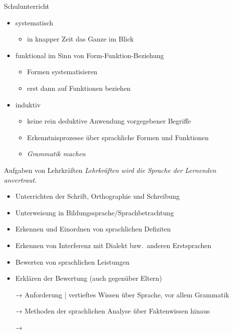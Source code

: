 \begin{frame}
  {Schulunterricht}
  \onslide<+->
  \begin{itemize}[<+->]
    \item \alert{systematisch}
      \begin{itemize}
        \item in knapper Zeit das Ganze im Blick
      \end{itemize}
      \Zeile
    \item funktional im Sinn von \alert{Form-Funktion-Beziehung}
      \begin{itemize}
        \item Formen systematisieren
        \item erst dann auf Funktionen beziehen
      \end{itemize}
      \Zeile
    \item \alert{induktiv}
      \begin{itemize}
        \item keine rein deduktive Anwendung vorgegebener Begriffe
        \item Erkenntnisprozesse über sprachliche Formen und Funktionen
        \item \alert{\textit{Grammatik machen}}\\
      \end{itemize}
  \end{itemize}
\end{frame}

\begin{frame}
  {Aufgaben von Lehrkräften}
  \onslide<+->
  \onslide<+->
  \alert{\textit{Lehrkräften wird die Sprache der Lernenden anvertraut.}} \\
  \Halbzeile
  \begin{itemize}[<+->]
    \item Unterrichten der Schrift, Orthographie und Schreibung
    \item Unterweisung in Bildungssprache\slash Sprachbetrachtung
      \Viertelzeile
    \item Erkennen und \alert{Einordnen} von \alert{sprachlichen Defiziten}
    \item Erkennen von \alert{Interferenz mit Dialekt bzw.\ anderen Erstsprachen}
      \Viertelzeile
    \item \alert{Bewerten} von sprachlichen Leistungen
    \item \alert{Erklären} der Bewertung (auch gegenüber Eltern)
      \Halbzeile
    \item[→] Anforderung | vertieftes Wissen über Sprache, vor allem Grammatik
    \item[→] Methoden der sprachlichen Analyse über Faktenwissen hinaus
    \item[→] 
  \end{itemize}
\end{frame}


